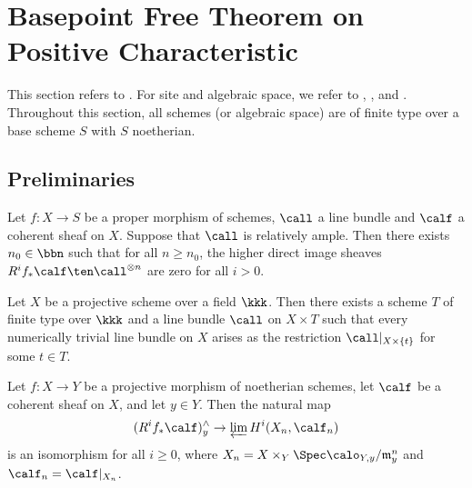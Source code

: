 \section{Basepoint Free Theorem on Positive Characteristic}

    This section refers to \cite{Kee99}.
    For site and algebraic space, we refer to \cite{Knu71}, \cite{Art70}, \cite{Stacks} and \cite{FGA05}.
    Throughout this section, all schemes (or algebraic space) are of finite type over a base scheme \(S\) with \(S\) noetherian.

\subsection{Preliminaries}

    \begin{theorem}\label{thm:Serre_vanishing_relative_setting}
        Let \(f:X \to S\) be a proper morphism of schemes, \(\call\) a line bundle and \(\calf\) a coherent sheaf on \(X\).
        Suppose that \(\call\) is relatively ample.
        Then there exists \(n_0 \in \bbn\) such that for all \(n \geq n_0\), the higher direct image sheaves \(R^if_* \calf \ten \call^{\otimes n}\) are zero for all \(i > 0\).
    \end{theorem}

    \begin{theorem}\label{thm:numerically_trivial_line_bundle_on_projective_scheme}
        Let \(X\) be a projective scheme over a field \(\kkk\).
        Then there exists a scheme \(T\) of finite type over \(\kkk\) and a line bundle \(\call\) on \(X \times T\) 
        such that every numerically trivial line bundle on \(X\) arises as the restriction \(\call|_{X \times \{t\}}\) for some \(t \in T\).
    \end{theorem}

        \begin{theorem}\label{thm:formal_functions}
            Let \(f: X \to Y\) be a projective morphism of noetherian schemes, let \(\calf\) be a coherent sheaf on \(X\), and let \(y \in Y\).
            Then the natural map
            \[
                (R^i f_* \calf)^{\wedge}_y \to \varprojlim H^i(X_n, \calf_n)
            \]
            is an isomorphism for all \(i \geq 0\), where \(X_n = X \times_Y \Spec \calo_{Y,y}/\mathfrak{m}_y^{n}\) and \(\calf_n = \calf|_{X_n}\).
        \end{theorem}

